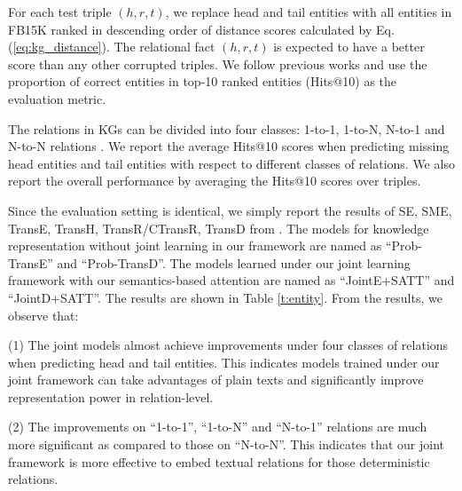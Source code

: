 \documentclass[letterpaper]{article} %
\begin{document}
For each test triple $(h, r, t)$, we replace head and tail entities with all entities in FB15K ranked in descending order of distance scores calculated by Eq. (\ref{eq:kg_distance}). The relational fact $(h, r, t)$ is expected to have a better score than any other corrupted triples. We follow previous works and use the proportion of correct entities in top-10 ranked entities (Hits@10) as the evaluation metric. 

The relations in KGs can be divided into four classes: 1-to-1, 1-to-N, N-to-1 and N-to-N relations \cite{bordes2013translating}. We report the average Hits@10 scores when predicting missing head entities and tail entities with respect to different classes of relations. We also report the overall performance by averaging the Hits@10 scores over triples. 

Since the evaluation setting is identical, we simply report the results of SE, SME, TransE, TransH, TransR/CTransR, TransD from \cite{bordes2011learning,bordes2012joint,bordes2013translating,wang2014transh,lin2015learning,ji2015knowledge}. The models for knowledge representation without joint learning in our framework are named as ``Prob-TransE'' and ``Prob-TransD''. The models learned under our joint learning framework with our semantics-based attention are named as ``JointE+SATT'' and ``JointD+SATT''. The results are shown in Table \ref{t:entity}. From the results, we observe that: 




(1) The joint models almost achieve improvements under four classes of relations when predicting head and tail entities. This indicates models trained under our joint framework can take advantages of plain texts and significantly improve representation power in relation-level. 

(2) The improvements on ``1-to-1'', ``1-to-N'' and ``N-to-1'' relations are much more significant as compared to those on ``N-to-N''. This indicates that our joint framework is more effective to embed textual relations for those deterministic relations. 

\end{document}
